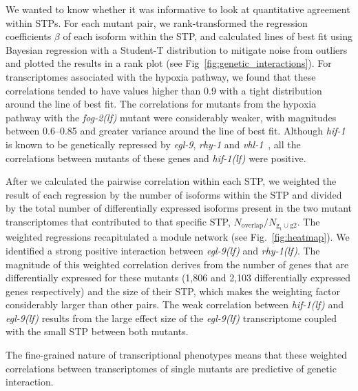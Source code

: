 \documentclass[10pt, onecolumn]{article}
\newcommand{\gene}[1]{\emph{#1}}
\newcommand{\fog}{\emph{\mbox{fog-2(lf)}}}
\newcommand{\egl}{\emph{\mbox{egl-9}(lf)}}
\newcommand{\rhy}{\emph{\mbox{rhy-1}(lf)}}
\newcommand{\hif}{\emph{\mbox{hif-1(lf)}}}
\newcommand{\egln}{1,806}
\newcommand{\rhyn}{2,103}
\begin{document}
We wanted to know whether it was informative to look at quantitative agreement
within STPs. For each mutant pair, we rank-transformed
the regression coefficients $\beta$ of each isoform within the STP, and
calculated lines of best fit using Bayesian regression with a Student-T
distribution to mitigate noise from outliers and plotted the results in a rank plot
(see Fig~\ref{fig:genetic_interactions}). For transcriptomes associated with the
hypoxia pathway, we found that these correlations tended to have
values higher than 0.9 with a tight distribution around the line of best fit.
The correlations for mutants from the hypoxia pathway
with the \fog{} mutant were considerably weaker, with magnitudes between
0.6--0.85 and greater variance around the line of best fit.
Although \gene{hif-1} is known to be genetically repressed by \gene{egl-9}, \gene{rhy-1} and
\gene{vhl-1}~\cite{Epstein2001,Shen2006}, all the correlations
between mutants of these genes and \hif{} were positive.

After we calculated the pairwise correlation within each STP,
we weighted the result of each regression by the
number of isoforms within the STP and
divided by the total number of differentially expressed isoforms present in the
two mutant transcriptomes that contributed to that specific STP,
$N_\mathrm{overlap}/N_{\mathrm{g_1} \cup \mathrm{g2}}$.
The weighted regressions recapitulated a module network (see Fig.~\ref{fig:heatmap}).
We identified a strong positive interaction between \egl{} and \rhy{}.
The magnitude of this weighted correlation derives from the number of genes
that are differentially expressed for these mutants (\egln{} and \rhyn{}
differentially expressed genes respectively) and the size of their STP, which makes
the weighting factor considerably larger than other pairs.
The weak correlation between \hif{} and \egl{} results from the large effect size
of the \egl{} transcriptome coupled with the small STP between both mutants.

The fine-grained nature of transcriptional phenotypes means that these weighted
correlations between transcriptomes of single mutants are predictive of genetic
interaction.
\end{document}
